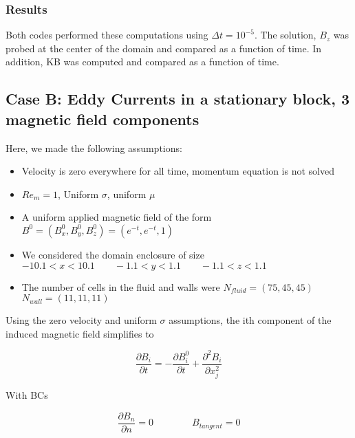 \documentclass[11pt]{article}
\newcommand{\figS}{22.1em}
\newcommand{\figH}{\figS}
\newcommand{\figW}{\figS}
\begin{document}
\subsubsection{Results}
Both codes performed these computations using $\Delta t = 10^{-5}$. The solution, $B_z$ was probed at the center of the domain and compared as a function of time. In addition, KB was computed and compared as a function of time. 

\begin{figure}[H]
 \centering
   \caption[Optional ]{}
\end{figure}

\subsection{Case B: Eddy Currents in a stationary block, 3 magnetic field components}
Here, we made the following assumptions:

\begin{itemize}
\item Velocity is zero everywhere for all time, momentum equation is not solved
\item $Re_m = 1$, Uniform $\sigma$, uniform $\mu$
\item A uniform applied magnetic field of the form $B^0 = (B_x^0,B_y^0,B_z^0) = (e^{-t},e^{-t},1)$
\item We considered the domain enclosure of size $-10.1 < x < 10.1 \qquad -1.1 < y < 1.1 \qquad -1.1 < z < 1.1$
\item The number of cells in the fluid and walls were $N_{fluid} = (75,45,45)$ \qquad $N_{wall} = (11,11,11)$
\end{itemize}

Using the zero velocity and uniform $\sigma$ assumptions, the ith component of the induced magnetic field simplifies to

\begin{equation}
	\frac{\partial B_i}{\partial t} 
	=
	-
	\frac{\partial B_i^0}{\partial t}
	+
	\frac{\partial^2 B_i}{\partial x_j^2} 
\end{equation}

With BCs

\begin{equation}
	\frac{\partial B_{n}}{\partial n} = 0
	\qquad \qquad
	B_{tangent} = 0
\end{equation}
\end{document}
